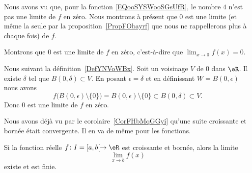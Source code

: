\begin{example}
    Nous avons vu que, pour la fonction \eqref{EQooSYSWooSGsUfR}, le nombre \( 4\) n'est pas une limite de \( f\) en zéro. Nous montrons à présent que \( 0\) est une limite (et même la seule par la proposition~\ref{PropFObayrf} que nous ne rappellerons plus à chaque fois) de \( f\).

    Montrons que \( 0\) est une limite de \( f\) en zéro, c'est-à-dire que \( \lim_{x\to 0} f(x)=0\).

    Nous suivant la définition~\ref{DefYNVoWBx}. Soit un voisinage \( V\) de \( 0\) dans \( \eR\). Il existe \( \delta\) tel que \( B(0,\delta)\subset V\). En posant \( \epsilon=\delta\) et en définissant \( W=B(0,\epsilon)\) nous avons
    \begin{equation}
        f\big( B(0,\epsilon)\setminus\{ 0 \} \big)=B(0,\epsilon)\setminus\{ 0 \}\subset  B(0,\delta)\subset V.
    \end{equation}
    Donc \( 0\) est une limite de \( f\) en zéro.
\end{example}

Nous avons déjà vu par le corolaire~\ref{CorFHbMqGGyi} qu'une suite croissante et bornée était convergente. Il en va de même pour les fonctions.
\begin{proposition} \label{PropMTmBYeU}
    Si la fonction réelle \( f\colon I=\mathopen[ a , b [\to \eR\) est croissante et bornée, alors la limite
    \begin{equation}
        \lim_{x\to b} f(x)
    \end{equation}
    existe et est finie.
\end{proposition}

